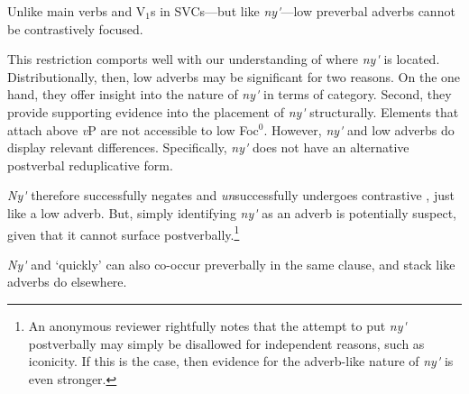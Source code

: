 \documentclass[output=paper
,newtxmath
,modfonts
,nonflat]{langsci/langscibook}
\begin{document}
Unlike main verbs and V$_1$s in SVCs---but like \textit{ny\'{\textturnv}\ng}---low preverbal adverbs cannot be contrastively focused.

\label{ex:duncan-et-al:20}
\z

\noindent This restriction comports well with our understanding of where \textit{ny\'{\textturnv}\ng} is located. Distributionally, then, low adverbs may be significant for two reasons. On the one hand, they offer insight into the nature of \textit{ny\'{\textturnv}\ng} in terms of category. Second, they provide supporting evidence into the placement of \textit{ny\'{\textturnv}\ng} structurally. Elements that attach above \textit{v}P are not accessible to low Foc$^0$. However, \textit{ny\'{\textturnv}\ng} and low adverbs do display relevant differences. Specifically, \textit{ny\'{\textturnv}\ng} does not have an alternative postverbal reduplicative form.

\label{ex:duncan-et-al:21}
\z

\noindent \textit{Ny\'{\textturnv}\ng} therefore successfully negates and \textit{un}successfully undergoes contrastive , just like a low adverb. But, simply identifying \textit{ny\'{\textturnv}\ng} as an adverb is potentially suspect, given that it cannot surface postverbally.\footnote{An anonymous reviewer rightfully notes that the attempt to put \textit{ny\'{\textturnv}\ng} postverbally may simply be disallowed for independent reasons, such as iconicity. If this is the case, then evidence for the adverb-like nature of \textit{ny\'{\textturnv}\ng} is even stronger.}

\textit{Ny\'{\textturnv}\ng} and `quickly' can also co-occur preverbally in the same clause, and stack like adverbs do elsewhere.

\ea\label{ex:duncan-et-al:22}
\z
\z
\end{document}
